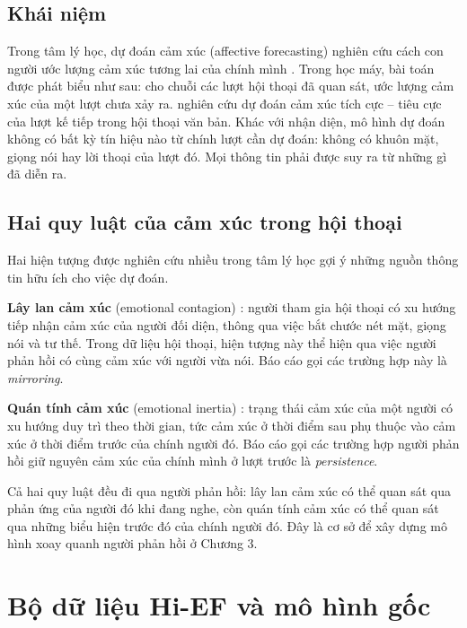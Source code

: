 \subsection{Khái niệm}

Trong tâm lý học, dự đoán cảm xúc (affective forecasting) nghiên cứu cách con người ước lượng cảm xúc tương lai của chính mình \cite{wilson2003affective}. Trong học máy, bài toán được phát biểu như sau: cho chuỗi các lượt hội thoại đã quan sát, ước lượng cảm xúc của một lượt chưa xảy ra. \citet{wang2020sentiment} nghiên cứu dự đoán cảm xúc tích cực -- tiêu cực của lượt kế tiếp trong hội thoại văn bản. Khác với nhận diện, mô hình dự đoán không có bất kỳ tín hiệu nào từ chính lượt cần dự đoán: không có khuôn mặt, giọng nói hay lời thoại của lượt đó. Mọi thông tin phải được suy ra từ những gì đã diễn ra.

\subsection{Hai quy luật của cảm xúc trong hội thoại}

Hai hiện tượng được nghiên cứu nhiều trong tâm lý học gợi ý những nguồn thông tin hữu ích cho việc dự đoán.

\textbf{Lây lan cảm xúc} (emotional contagion) \cite{hatfield1994contagion}: người tham gia hội thoại có xu hướng tiếp nhận cảm xúc của người đối diện, thông qua việc bắt chước nét mặt, giọng nói và tư thế. Trong dữ liệu hội thoại, hiện tượng này thể hiện qua việc người phản hồi có cùng cảm xúc với người vừa nói. Báo cáo gọi các trường hợp này là \emph{mirroring}.

\textbf{Quán tính cảm xúc} (emotional inertia) \cite{kuppens2010inertia}: trạng thái cảm xúc của một người có xu hướng duy trì theo thời gian, tức cảm xúc ở thời điểm sau phụ thuộc vào cảm xúc ở thời điểm trước của chính người đó. Báo cáo gọi các trường hợp người phản hồi giữ nguyên cảm xúc của chính mình ở lượt trước là \emph{persistence}.

Cả hai quy luật đều đi qua người phản hồi: lây lan cảm xúc có thể quan sát qua phản ứng của người đó khi đang nghe, còn quán tính cảm xúc có thể quan sát qua những biểu hiện trước đó của chính người đó. Đây là cơ sở để xây dựng mô hình xoay quanh người phản hồi ở Chương 3.

\section{Bộ dữ liệu Hi-EF và mô hình gốc}

